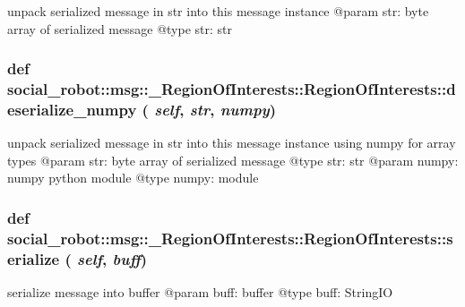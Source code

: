 \begin{DoxyVerb}
unpack serialized message in str into this message instance
@param str: byte array of serialized message
@type  str: str
\end{DoxyVerb}
 \hypertarget{classsocial__robot_1_1msg_1_1__RegionOfInterests_1_1RegionOfInterests_a6d25339da85ed702e19e3ccdeb88d360}{
\subsubsection[{deserialize\_\-numpy}]{\setlength{\rightskip}{0pt plus 5cm}def social\_\-robot::msg::\_\-RegionOfInterests::RegionOfInterests::deserialize\_\-numpy ( {\em self}, \/   {\em str}, \/   {\em numpy})}}
\label{classsocial__robot_1_1msg_1_1__RegionOfInterests_1_1RegionOfInterests_a6d25339da85ed702e19e3ccdeb88d360}
\begin{DoxyVerb}
unpack serialized message in str into this message instance using numpy for array types
@param str: byte array of serialized message
@type  str: str
@param numpy: numpy python module
@type  numpy: module
\end{DoxyVerb}
 \hypertarget{classsocial__robot_1_1msg_1_1__RegionOfInterests_1_1RegionOfInterests_abb6d0b069ff1727aec6ded395d171a77}{
\subsubsection[{serialize}]{\setlength{\rightskip}{0pt plus 5cm}def social\_\-robot::msg::\_\-RegionOfInterests::RegionOfInterests::serialize ( {\em self}, \/   {\em buff})}}
\label{classsocial__robot_1_1msg_1_1__RegionOfInterests_1_1RegionOfInterests_abb6d0b069ff1727aec6ded395d171a77}
\begin{DoxyVerb}
serialize message into buffer
@param buff: buffer
@type  buff: StringIO
\end{DoxyVerb}
